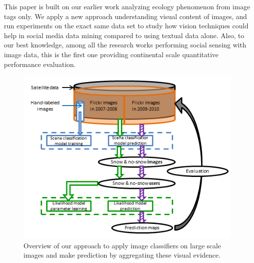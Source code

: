 This paper is built on our earlier work  analyzing ecology phenomenon from image tags only. We apply a new approach understanding visual content of images, and run experiments on the exact same data set to study how vision techniques could help in social media data mining compared to using textual data alone. Also, to our best knowledge, among all the research works performing social sensing with image data, this is the first one providing continental scale quantitative performance evaluation.


\begin{figure}
\centering
\includegraphics[scale=1]{figure/flowchartWevaluation.png}
\caption{Overview of our approach to apply image classifiers on large scale images and make prediction by aggregating these visual evidence. }
\label{fig:overview}
\end{figure}


